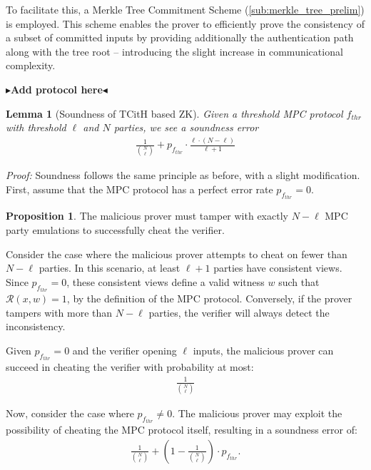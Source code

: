 \documentclass[11pt]{report}
\theoremstyle{definition}
\newtheorem{proposition}{Proposition}[section]
\theoremstyle{plain}
\newtheorem{lemma}{Lemma}[section]
\newcommand{\todo}[1]{{\color[rgb]{.5,0,0}\textbf{$\blacktriangleright$#1$\blacktriangleleft$}}}
\begin{document}
To facilitate this, a Merkle Tree Commitment Scheme (\autoref{sub:merkle_tree_prelim}) is employed. This scheme enables the prover to efficiently prove the consistency of a subset of committed inputs by providing additionally the authentication path along with the tree root -- introducing the slight increase in communicational complexity.

\todo{Add protocol here}

\begin{lemma}[Soundness of TCitH based ZK]
  Given a threshold MPC protocol $ f_{thr} $ with threshold $ \ell $ and $ N $ parties, we see a soundness error
  \begin{align*}
    \frac{1}{\binom{N}{\ell}} + p_{f_{thr}} \cdot \frac{\ell \cdot (N - \ell)}{\ell + 1}
  \end{align*}
\end{lemma}

\textit{Proof:} Soundness follows the same principle as before, with a slight modification. First, assume that the MPC protocol has a perfect error rate $  p_{f_{thr}} = 0  $.

\begin{proposition}
  The malicious prover must tamper with exactly $  N - \ell  $ MPC party emulations to successfully cheat the verifier.
\end{proposition}

Consider the case where the malicious prover attempts to cheat on fewer than $  N - \ell  $ parties. In this scenario, at least $  \ell + 1  $ parties have consistent views. Since $  p_{f_{thr}} = 0  $, these consistent views define a valid witness $  w  $ such that $  \mathcal{R}(x, w) = 1  $, by the definition of the MPC protocol. Conversely, if the prover tampers with more than $  N - \ell  $ parties, the verifier will always detect the inconsistency.

Given $  p_{f_{thr}} = 0  $ and the verifier opening $  \ell  $ inputs, the malicious prover can succeed in cheating the verifier with probability at most:
\begin{align*}
  \frac{1}{\binom{N}{\ell}}
\end{align*}

Now, consider the case where $  p_{f_{thr}} \neq 0  $. The malicious prover may exploit the possibility of cheating the MPC protocol itself, resulting in a soundness error of:
\begin{align*}
  \frac{1}{\binom{N}{\ell}} + \left(1 - \frac{1}{\binom{N}{\ell}}\right) \cdot p_{f_{thr}}.
\end{align*}
\end{document}
